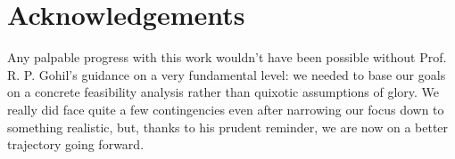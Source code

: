 \documentclass[12pt,a4paper,twoside,openright,bibliography=totocnumbered]{report}
\begin{document}





\chapter*{Acknowledgements}

Any palpable progress with this work wouldn't have been possible without Prof. R. P. Gohil's guidance on a very fundamental level: we needed to base our goals on a concrete feasibility analysis rather than quixotic assumptions of glory. We really did face quite a few contingencies even after narrowing our focus down to something realistic, but, thanks to his prudent reminder, we are now on a better trajectory going forward. 
\end{document}
